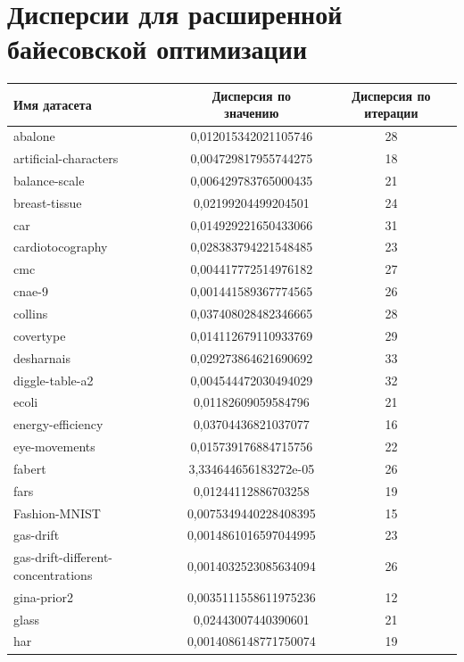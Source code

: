 \documentclass[times,specification,annotation]{itmo-student-thesis}
\begin{document}
\chapter{Дисперсии для расширенной байесовской оптимизации}\label{app:pbo-disp}
\begin{center} 
	\begin{longtable}{ |m{5cm}|c|c| } 
		\hline
		\textbf{Имя датасета} & \textbf{Дисперсия по значению} & \textbf{Дисперсия по итерации} \\
		\hline\hline
		abalone & 0,012015342021105746 & 28 \\
		\hline
		artificial-characters & 0,004729817955744275 & 18 \\
		\hline
		balance-scale & 0,006429783765000435 & 21 \\
		\hline
		breast-tissue & 0,02199204499204501 & 24 \\
		\hline
		car & 0,014929221650433066 & 31 \\
		\hline
		cardiotocography & 0,028383794221548485 & 23 \\
		\hline
		cmc & 0,004417772514976182 & 27 \\
		\hline
		cnae-9 & 0,001441589367774565 & 26 \\
		\hline
		collins & 0,037408028482346665 & 28 \\
		\hline
		covertype & 0,014112679110933769 & 29 \\
		\hline
		desharnais & 0,029273864621690692 & 33 \\
		\hline
		diggle-table-a2 & 0,004544472030494029 & 32 \\
		\hline
		ecoli & 0,01182609059584796 & 21 \\
		\hline
		energy-efficiency & 0,03704436821037077 & 16 \\
		\hline
		eye-movements & 0,015739176884715756 & 22 \\
		\hline
		fabert & 3,334644656183272e-05 & 26 \\
		\hline
		fars & 0,01244112886703258 & 19 \\
		\hline
		Fashion-MNIST & 0,0075349440228408395 & 15 \\
		\hline
		gas-drift & 0,0014861016597044995 & 23 \\
		\hline
		gas-drift-different-concentrations & 0,0014032523085634094 & 26 \\
		\hline
		gina-prior2 & 0,0035111558611975236 & 12 \\
		\hline
		glass & 0,02443007440390601 & 21 \\
		\hline
		har & 0,0014086148771750074 & 19 \\

\end{longtable}
\end{center}
\end{document}
